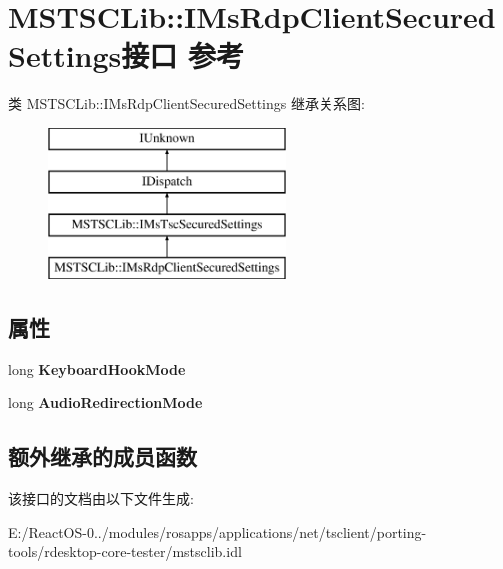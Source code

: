 \hypertarget{interface_m_s_t_s_c_lib_1_1_i_ms_rdp_client_secured_settings}{}\section{M\+S\+T\+S\+C\+Lib\+:\+:I\+Ms\+Rdp\+Client\+Secured\+Settings接口 参考}
\label{interface_m_s_t_s_c_lib_1_1_i_ms_rdp_client_secured_settings}
类 M\+S\+T\+S\+C\+Lib\+:\+:I\+Ms\+Rdp\+Client\+Secured\+Settings 继承关系图\+:\begin{figure}[H]
\begin{center}
\leavevmode
\includegraphics[height=4.000000cm]{interface_m_s_t_s_c_lib_1_1_i_ms_rdp_client_secured_settings}
\end{center}
\end{figure}
\subsection*{属性}
\begin{DoxyCompactItemize}
\item 
\mbox{\label{interface_m_s_t_s_c_lib_1_1_i_ms_rdp_client_secured_settings_aa1527f86ee4d437709cf26babe44c58b}} 
long {\bfseries Keyboard\+Hook\+Mode}
\item 
\mbox{\label{interface_m_s_t_s_c_lib_1_1_i_ms_rdp_client_secured_settings_aaf32a63e2489b38a44c407724692c848}} 
long {\bfseries Audio\+Redirection\+Mode}
\end{DoxyCompactItemize}
\subsection*{额外继承的成员函数}


该接口的文档由以下文件生成\+:\begin{DoxyCompactItemize}
\item 
E\+:/\+React\+O\+S-\/0../modules/rosapps/applications/net/tsclient/porting-\/tools/rdesktop-\/core-\/tester/mstsclib.\+idl\end{DoxyCompactItemize}

